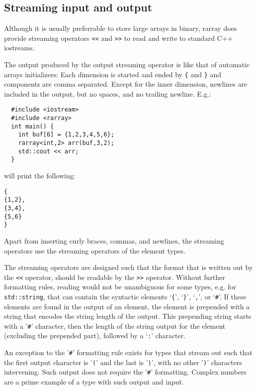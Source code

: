 \documentclass[11pt,twoside]{article}
\begin{document}
\subsection{Streaming input and output}

Although it is usually preferrable to store large arrays in binary, rarray does provide streaming operators \texttt{<<} and \texttt{>>} to read and write to standard C++ iostreams.  

The output produced by the output streaming operator is like that of
automatic arrays initializers: Each dimension is started and ended by
\texttt{\{} and \texttt{\}} and components are comma separated.
Except for the inner dimension, newlines are included in the output,
but no spaces, and no trailing newline.
E.g.:\vspace{-9pt}
\begin{framed}\vspace{-18pt}%
\begin{verbatim}
  #include <iostream>
  #include <rarray>
  int main() {
    int buf[6] = {1,2,3,4,5,6};
    rarray<int,2> arr(buf,3,2);
    std::cout << arr;
  }
\end{verbatim}%
\vspace{-12pt}
\end{framed}\vspace{-8pt}\noindent
will print the following:
\begin{verbatim}
{
{1,2},
{3,4},
{5,6}
}
\end{verbatim}
Apart from inserting curly braces, commas, and newlines, the streaming
operators use the streaming operators of the element types. 

The streaming operators are designed such that the format that is
written out by the \texttt{<<} operator, should be readable by the
\texttt{>>} operator.  
Without further formatting rules, reading would not be unambiguous for
some types, e.g. for
\texttt{std::string}, that can contain the syntactic elements
`\texttt{\{}', `\texttt{\}}', `\texttt{,}', or `\texttt{\#}'.  If these elements are found in the output of an element, the element is prepended with a string that encodes the string length of the output. This prepending string starts with a '\texttt\#' character, then the length of the string output for the element  (excluding the prepended part), followed by a `\texttt:' character.

An exception to the '\texttt\#' formatting rule exists for types that
stream out such that the first output character is '\texttt(' and the
last is '\texttt)', with no other '\texttt)' characters
intervening. Such output does not require the '\texttt\#'
formatting. Complex numbers are a prime example of a type with such
output and input.
\end{document}
